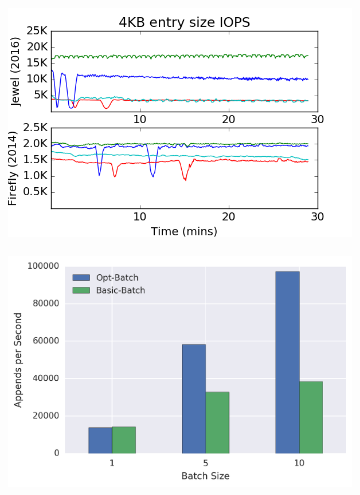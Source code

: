\begin{figure}[t]
    \centering
    \begin{subfigure}[b]{.30\linewidth}
        \centering
        \includegraphics[width=1.0\linewidth]{jewel_v_firefly_pd.png}
        \caption{}
        \label{fig:phy-design}
    \end{subfigure}
    \begin{subfigure}[b]{.30\linewidth}
        \centering
        \includegraphics[width=1.0\linewidth]{batching.png}
        \caption{}
        \label{fig:batching}
    \end{subfigure}
    \begin{subfigure}[b]{.30\linewidth}
        \centering

\end{subfigure}
\end{figure}

